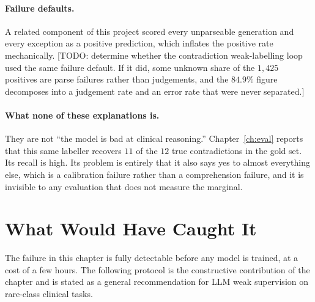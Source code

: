 \paragraph{Failure defaults.} A related component of this project scored every
unparseable generation and every exception as a positive prediction, which
inflates the positive rate mechanically. [TODO: determine whether the
contradiction weak-labelling loop used the same failure default. If it did, some
unknown share of the $1{,}425$ positives are parse failures rather than
judgements, and the $84.9\%$ figure decomposes into a judgement rate and an
error rate that were never separated.]

\paragraph{What none of these explanations is.} They are not ``the model is bad
at clinical reasoning.'' Chapter~\ref{ch:eval} reports that this same labeller
recovers $11$ of the $12$ true contradictions in the gold set. Its recall is
high. Its problem is entirely that it also says yes to almost everything else,
which is a calibration failure rather than a comprehension failure, and it is
invisible to any evaluation that does not measure the marginal.

\section{What Would Have Caught It}
\label{sec:weak-diagnostics}

The failure in this chapter is fully detectable before any model is trained, at
a cost of a few hours. The following protocol is the constructive contribution
of the chapter and is stated as a general recommendation for LLM weak
supervision on rare-class clinical tasks.

